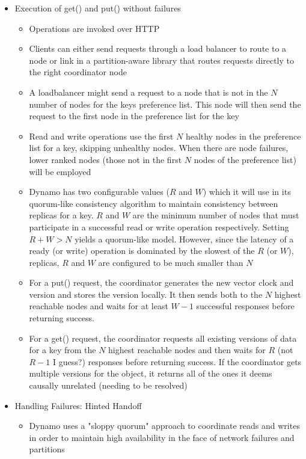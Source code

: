 \documentclass[a4paper]{article}
\begin{document}
\begin{itemize}
\begin{itemize}
\item Execution of get() and put() without failures
\begin{itemize}
\item Operations are invoked over HTTP

\item Clients can either send requests through a load balancer to route to a node or link in a partition-aware library that routes requests directly to the right coordinator node

\item A loadbalancer might send a request to a node that is not in the $N$ number of nodes for the keys preference list. This node will then send the request to the first node in the preference list for the key

\item Read and write operations use the first $N$ healthy nodes in the preference list for a key, skipping unhealthy nodes. When there are node failures, lower ranked nodes (those not in the first $N$ nodes of the preference list) will be employed

\item Dynamo has two configurable values ($R$ and $W$) which it will use in its quorum-like consistency algorithm to maintain consistency between replicas for a key. $R$ and $W$ are the minimum number of nodes that must participate in a successful read or write operation respectively. Setting $R + W > N$ yields a quorum-like model. However, since the latency of a ready (or write) operation is dominated by the slowest of the $R$ (or $W$), replicas, $R$ and $W$ are configured to be much smaller than $N$

\item For a put() request, the coordinator generates the new vector clock and version and stores the version locally. It then sends both to the $N$ highest reachable nodes and waits for at least $W-1$ successful responses before returning success.

\item For a get() request, the coordinator requests all existing versions of data for a key from the $N$ highest reachable nodes and then waits for $R$ (not $R-1$ I guess?) responses before returning success. If the coordinator gets multiple versions for the object, it returns all of the ones it deems causally unrelated (needing to be resolved)
\end{itemize}

\item Handling Failures: Hinted Handoff
\begin{itemize}
\item Dynamo uses a "sloppy quorum" approach to coordinate reads and writes in order to maintain high availability in the face of network failures and partitions


\end{itemize}
\end{itemize}
\end{itemize}
\end{document}

